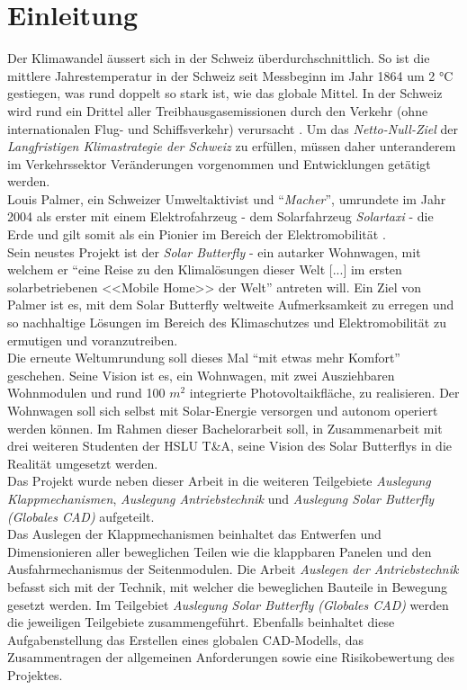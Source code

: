\section{Einleitung}
\cite{Huber}
Der Klimawandel äussert sich in der Schweiz überdurchschnittlich. So ist die mittlere Jahrestemperatur in der Schweiz seit Messbeginn im Jahr 1864 um 2 °C gestiegen, was rund doppelt so stark ist, wie das globale Mittel. In der Schweiz wird rund ein Drittel aller Treibhausgasemissionen durch den Verkehr (ohne internationalen Flug- und Schiffsverkehr) verursacht \cite{BAFU}. Um das \emph{Netto-Null-Ziel} der \emph{Langfristigen Klimastrategie der Schweiz} zu erfüllen, müssen daher unteranderem im Verkehrssektor Veränderungen vorgenommen und Entwicklungen getätigt werden.\\
Louis Palmer, ein Schweizer Umweltaktivist und ``\emph{Macher}'', umrundete im Jahr 2004 als erster mit einem Elektrofahrzeug - dem Solarfahrzeug \emph{Solartaxi} - die Erde und gilt somit als ein Pionier im Bereich der Elektromobilität \cite{Palmer}.\\
Sein neustes Projekt ist der \emph{Solar Butterfly} - ein autarker Wohnwagen, mit welchem er ``eine Reise zu den Klimalösungen dieser Welt [...] im ersten solarbetriebenen <<Mobile Home>> der Welt'' antreten will. Ein Ziel von Palmer ist es, mit dem Solar Butterfly weltweite Aufmerksamkeit zu erregen und so nachhaltige Lösungen im Bereich des Klimaschutzes und Elektromobilität zu ermutigen und voranzutreiben.\\
Die erneute Weltumrundung soll dieses Mal ``mit etwas mehr Komfort'' geschehen. Seine Vision ist es, ein Wohnwagen, mit zwei Ausziehbaren Wohnmodulen und rund 100 $m^2$ integrierte Photovoltaikfläche, zu realisieren. Der Wohnwagen soll sich selbst mit Solar-Energie versorgen und autonom operiert werden können. Im Rahmen dieser Bachelorarbeit soll, in Zusammenarbeit mit drei weiteren Studenten der HSLU T\&A, seine Vision des Solar Butterflys in die Realität umgesetzt werden.\\
Das Projekt wurde neben dieser Arbeit in die weiteren Teilgebiete \emph{Auslegung Klappmechanismen}, \emph{Auslegung Antriebstechnik} und \emph{Auslegung Solar Butterfly (Globales CAD)} aufgeteilt.\\
Das Auslegen der Klappmechanismen beinhaltet das Entwerfen und Dimensionieren aller beweglichen Teilen wie die klappbaren Panelen und den Ausfahrmechanismus der Seitenmodulen. Die Arbeit \emph{Auslegen der Antriebstechnik} befasst sich mit der Technik, mit welcher die beweglichen Bauteile in Bewegung gesetzt werden. Im Teilgebiet \emph{Auslegung Solar Butterfly (Globales CAD)} werden die jeweiligen Teilgebiete zusammengeführt. Ebenfalls beinhaltet diese Aufgabenstellung das Erstellen eines globalen CAD-Modells, das Zusammentragen der allgemeinen Anforderungen sowie eine Risikobewertung des Projektes.\\


